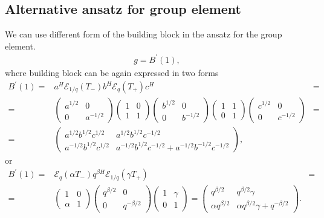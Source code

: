 \documentclass{article}
\newcommand{\lb}{\left (}
\newcommand{\rb}{\right )}
\newcommand{\lsb}{\left [}
\newcommand{\rsb}{\right ]}
\newcommand{\be}{\begin{eqnarray}}
\newcommand{\ee}{\end{eqnarray}}
\newcommand {\?}{\textit{???}}
\newcommand{\me}[0]{\mathcal{E}}
\newcommand{\Bp}[1]{B^{'}\lb #1 \rb}
\newcommand{\matd}[4]{\lb \begin{array}{cc}
#1 & #2 \\ #3 & #4
\end{array} \rb}
\newcommand{\delabel}[1]{(\ref{#1})}
\newcommand{\Honed}[1]{\lb \begin{array}{ccc}
#1^{1/2} & 0 \\ 0 & #1^{-1/2}
\end{array} \rb}
\newcommand{\Eoned}[1]{\lb \begin{array}{cc}
1 & #1 \\ 0 & 1
\end{array} \rb}
\newcommand{\Foned}[1]{\lb \begin{array}{cc}
1 & 0 \\ #1 & 1
\end{array} \rb}
\begin{document}







\subsection{Alternative ansatz for group element}

We can use different form of the building block in the ansatz for the group element.
\be
\label{quantum-group-element-alt-sl2}
g = \Bp{1},
\ee
where building block can be again expressed in two forms
\be
\label{building-block-alt-sl2-fg}
\Bp{1} = & a^H \me_{1/q} \lb T_-\rb b^H \me_{q} \lb T_+ \rb c^H & = \\
= & \Honed{a} \Foned{1} \Honed{b} \Eoned{1} \Honed{c} & = \nonumber \\
= & \matd{a^{1/2}b^{1/2}c^{1/2}}{a^{1/2}b^{1/2}c^{-1/2}}
{a^{-1/2}b^{1/2}c^{1/2}}{a^{-1/2}b^{1/2}c^{-1/2} + a^{-1/2}b^{-1/2}c^{-1/2}} \nonumber,
\ee
or
\be
\label{building-block-alt-sl2-mv}
\Bp{1} = & \me_q \lb \alpha T_- \rb q^{\beta H} \me_{1/q} \lb \gamma T_+ \rb & = \\
= & \Foned{\alpha} \matd{q^{\beta/2}}{0}{0}{q^{-\beta/2}} \Eoned{\gamma}
= \matd{q^{\beta/2}}{q^{\beta/2}\gamma}{\alpha q^{\beta/2}}{\alpha q^{\beta/2}\gamma  + q^{-\beta/2}} \nonumber.
\ee
\end{document}
